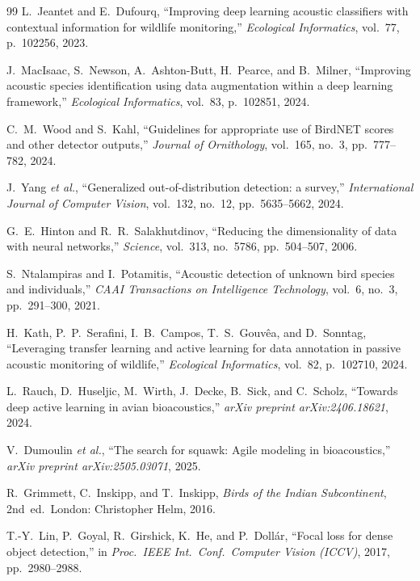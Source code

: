 \documentclass[conference]{IEEEtran}
\begin{document}
\begin{thebibliography}{99}
L.~Jeantet and E.~Dufourq, ``Improving deep learning acoustic classifiers with contextual information for wildlife monitoring,'' \textit{Ecological Informatics}, vol.~77, p.~102256, 2023.

J.~MacIsaac, S.~Newson, A.~Ashton-Butt, H.~Pearce, and B.~Milner, ``Improving acoustic species identification using data augmentation within a deep learning framework,'' \textit{Ecological Informatics}, vol.~83, p.~102851, 2024.

C.~M.~Wood and S.~Kahl, ``Guidelines for appropriate use of BirdNET scores and other detector outputs,'' \textit{Journal of Ornithology}, vol.~165, no.~3, pp.~777--782, 2024.

J.~Yang \textit{et al.}, ``Generalized out-of-distribution detection: a survey,'' \textit{International Journal of Computer Vision}, vol.~132, no.~12, pp.~5635--5662, 2024.

G.~E.~Hinton and R.~R.~Salakhutdinov, ``Reducing the dimensionality of data with neural networks,'' \textit{Science}, vol.~313, no.~5786, pp.~504--507, 2006.

S.~Ntalampiras and I.~Potamitis, ``Acoustic detection of unknown bird species and individuals,'' \textit{CAAI Transactions on Intelligence Technology}, vol.~6, no.~3, pp.~291--300, 2021.

H.~Kath, P.~P.~Serafini, I.~B.~Campos, T.~S.~Gouv\^ea, and D.~Sonntag, ``Leveraging transfer learning and active learning for data annotation in passive acoustic monitoring of wildlife,'' \textit{Ecological Informatics}, vol.~82, p.~102710, 2024.

L.~Rauch, D.~Huseljic, M.~Wirth, J.~Decke, B.~Sick, and C.~Scholz, ``Towards deep active learning in avian bioacoustics,'' \textit{arXiv preprint arXiv:2406.18621}, 2024.

V.~Dumoulin \textit{et al.}, ``The search for squawk: Agile modeling in bioacoustics,'' \textit{arXiv preprint arXiv:2505.03071}, 2025.

R.~Grimmett, C.~Inskipp, and T.~Inskipp, \textit{Birds of the Indian Subcontinent}, 2nd~ed.\ London: Christopher Helm, 2016.

T.-Y.~Lin, P.~Goyal, R.~Girshick, K.~He, and P.~Doll\'ar, ``Focal loss for dense object detection,'' in \textit{Proc.\ IEEE Int.\ Conf.\ Computer Vision (ICCV)}, 2017, pp.~2980--2988.


\end{thebibliography}
\end{document}
